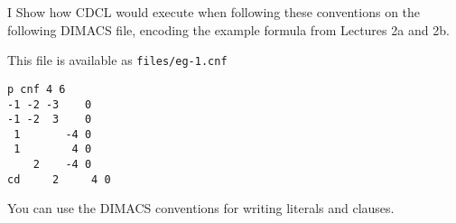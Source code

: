 \snewpage

\begin{problem}{I}
  Show how CDCL would execute when following these conventions on the following
  DIMACS file, encoding the example formula from Lectures 2a and 2b.

  This file is available as \texttt{files/eg-1.cnf}  
  \begin{lstlisting}
p cnf 4 6
-1 -2 -3    0
-1 -2  3    0
 1       -4 0
 1        4 0
    2    -4 0
cd     2     4 0
  \end{lstlisting}
  You can use the DIMACS conventions for writing literals and clauses.
  
\end{problem}

\snewpage

